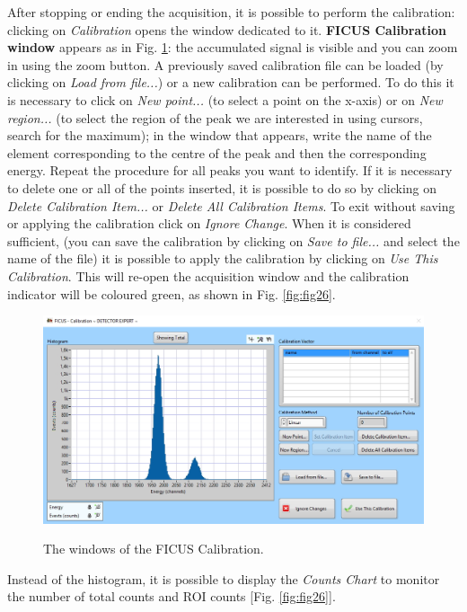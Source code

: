 \documentclass[a4paper,12pt,oneside,pdflatex,italian,final,twocolumn]{article}
\begin{document}
After stopping or ending the acquisition, it is possible to perform the calibration: clicking on \textit{Calibration} opens the window dedicated to it. \textbf{FICUS Calibration window} appears as in Fig.  \ref{fig:fig25}: the accumulated signal is visible and you can zoom in using the zoom button.
A previously saved calibration file can be loaded (by clicking on \textit{Load from file...}) or a new calibration can be performed. To do this it is necessary to click on \textit{New point...} (to select a point on the x-axis) or on \textit{New region...} (to select the region of the peak we are interested in using cursors, search for the maximum); in the window that appears, write the name of the element corresponding to the centre of the peak and then the corresponding energy.
Repeat the procedure for all peaks you want to identify. If it is necessary to delete one or all of the points inserted, it is possible to do so by clicking on \textit{Delete Calibration Item...} or \textit{Delete All Calibration Items}. To exit without saving or applying the calibration click on \textit{Ignore Change}. When it is considered sufficient, (you can save the calibration by clicking on \textit{Save to file...} and select the name of the file) it is possible to apply the calibration by clicking on \textit{Use This Calibration}. This will re-open the acquisition window and the calibration indicator will be coloured green, as shown in Fig. \ref{fig:fig26}.

\begin{figure}[h!]
\centering
{\includegraphics[width=.7\textwidth]{Cattura63.jpg}} \quad
\caption{The windows of the FICUS Calibration.}\label{fig:fig25}
\end{figure}

Instead of the histogram, it is possible to display the \textit{Counts Chart} to monitor the number of total counts and ROI counts [Fig. \ref{fig:fig26}].
\end{document}
